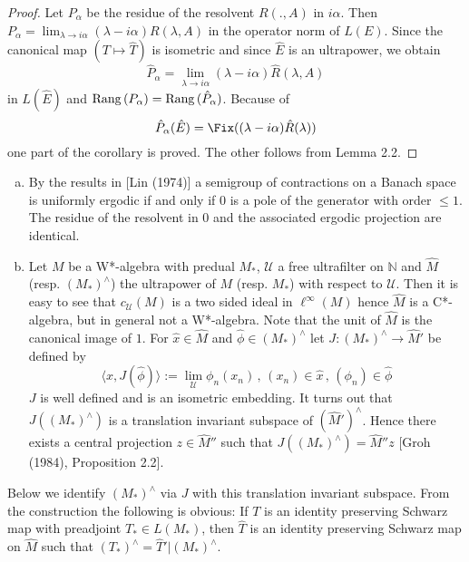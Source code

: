 \begin{proof}
Let $P_{\alpha}$ be the residue of the resolvent $R(.,A)$ in $i\alpha$.
Then $P_{\alpha} = \lim_{\lambda \to i\alpha}(\lambda - i\alpha)R(\lambda,A)$ in the operator norm of $L(E)$.
Since the canonical map $(T \mapsto \hat{T})$ is isometric and since $\hat{E}$ is an ultrapower, we obtain
\[
\hat{P}_{\alpha} = \lim_{\lambda \to i\alpha}(\lambda - i\alpha)\hat{R}(\lambda,A)
\]
in $L(\hat{E})$ and $\mathrm{Rang}\,(P_{\alpha}) = \mathrm{Rang}\,(\hat{P}_{\alpha})$.
Because of
\[
\hat{P}_{\alpha}(\hat{E}) = \Fix((\lambda-i\alpha)\hat{R}(\lambda))
\]
one part of the corollary is proved. The other follows from Lemma 2.2.
\end{proof}

\begin{remarks}\label{rem:d3-2-4}
\begin{enumerate}[(a)]
\item
By the results in [Lin (1974)] a semigroup of contractions on a Banach space is uniformly ergodic if and only if $0$ is a pole of the generator with order $\leq 1$.
The residue of the resolvent in $0$ and the associated ergodic projection are identical.
\item
Let $M$ be a W*-algebra with predual $M_{*}$, $\mathcal{U}$ a free ultrafilter on $\mathbb{N}$ and $\hat{M}$ (resp. $(M_{*})^{\wedge}$) the ultrapower of $M$ (resp. $M_{*}$) with respect to $\mathcal{U}$.
Then it is easy to see that $c_{\mathcal{U}}(M)$ is a two sided ideal in $\ell^{\infty}(M)$ hence $\hat{M}$ is a C*-algebra, but in general not a W*-algebra.
Note that the unit of $\hat{M}$ is the canonical image of $1$.
For $\hat{x} \in \hat{M}$ and $\hat{\phi} \in (M_{*})^{\wedge}$ let $J: (M_{*})^{\wedge} \to \hat{M}'$ be defined by
\[
\langle x,J(\hat{\phi}) \rangle := \lim_{\mathcal{U}}\phi_{n}(x_{n}) \, , \, (x_{n}) \in \hat{x} \, , \, (\phi_{n}) \in \hat{\phi}
\]
$J$ is well defined and is an isometric embedding.
It turns out that $J((M_{*})^{\wedge})$ is a translation invariant subspace of $(\hat{M}')^{\wedge}$.
Hence there exists a central projection $z \in \hat{M}''$ such that $J((M_{*})^{\wedge}) = \hat{M}''z$ [Groh (1984), Proposition 2.2].
\end{enumerate}
\end{remarks}





Below we identify $(M_{*})^{\wedge}$ via $J$ with this translation invariant subspace.
From the construction the following is obvious: If $T$ is an identity preserving Schwarz map with preadjoint $T_{*} \in L(M_{*})$, then $\hat{T}$ is an identity preserving Schwarz map on $\hat{M}$ such that $(T_{*})^{\wedge} = \hat{T}'|(M_{*})^{\wedge}$.

